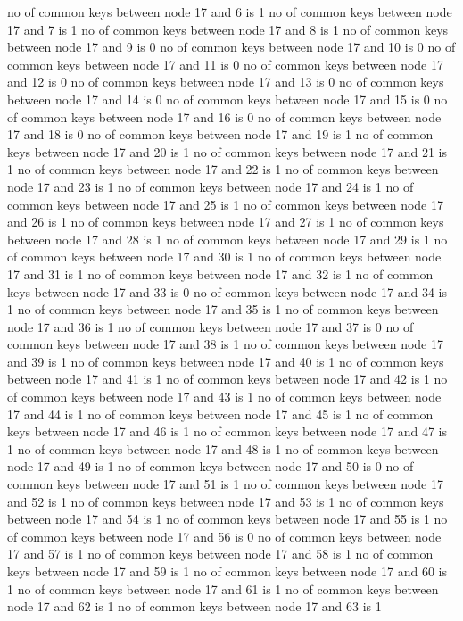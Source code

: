 no of common keys between node 17 and 6 is 1
no of common keys between node 17 and 7 is 1
no of common keys between node 17 and 8 is 1
no of common keys between node 17 and 9 is 0
no of common keys between node 17 and 10 is 0
no of common keys between node 17 and 11 is 0
no of common keys between node 17 and 12 is 0
no of common keys between node 17 and 13 is 0
no of common keys between node 17 and 14 is 0
no of common keys between node 17 and 15 is 0
no of common keys between node 17 and 16 is 0
no of common keys between node 17 and 18 is 0
no of common keys between node 17 and 19 is 1
no of common keys between node 17 and 20 is 1
no of common keys between node 17 and 21 is 1
no of common keys between node 17 and 22 is 1
no of common keys between node 17 and 23 is 1
no of common keys between node 17 and 24 is 1
no of common keys between node 17 and 25 is 1
no of common keys between node 17 and 26 is 1
no of common keys between node 17 and 27 is 1
no of common keys between node 17 and 28 is 1
no of common keys between node 17 and 29 is 1
no of common keys between node 17 and 30 is 1
no of common keys between node 17 and 31 is 1
no of common keys between node 17 and 32 is 1
no of common keys between node 17 and 33 is 0
no of common keys between node 17 and 34 is 1
no of common keys between node 17 and 35 is 1
no of common keys between node 17 and 36 is 1
no of common keys between node 17 and 37 is 0
no of common keys between node 17 and 38 is 1
no of common keys between node 17 and 39 is 1
no of common keys between node 17 and 40 is 1
no of common keys between node 17 and 41 is 1
no of common keys between node 17 and 42 is 1
no of common keys between node 17 and 43 is 1
no of common keys between node 17 and 44 is 1
no of common keys between node 17 and 45 is 1
no of common keys between node 17 and 46 is 1
no of common keys between node 17 and 47 is 1
no of common keys between node 17 and 48 is 1
no of common keys between node 17 and 49 is 1
no of common keys between node 17 and 50 is 0
no of common keys between node 17 and 51 is 1
no of common keys between node 17 and 52 is 1
no of common keys between node 17 and 53 is 1
no of common keys between node 17 and 54 is 1
no of common keys between node 17 and 55 is 1
no of common keys between node 17 and 56 is 0
no of common keys between node 17 and 57 is 1
no of common keys between node 17 and 58 is 1
no of common keys between node 17 and 59 is 1
no of common keys between node 17 and 60 is 1
no of common keys between node 17 and 61 is 1
no of common keys between node 17 and 62 is 1
no of common keys between node 17 and 63 is 1
